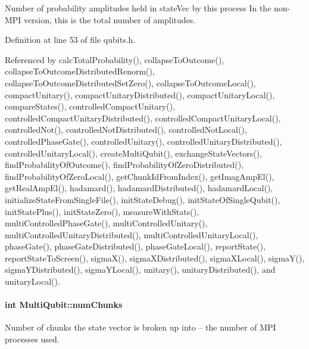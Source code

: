 Number of probability amplitudes held in state\+Vec by this process In the non-\/\+M\+PI version, this is the total number of amplitudes. 



Definition at line 53 of file qubits.\+h.



Referenced by calc\+Total\+Probability(), collapse\+To\+Outcome(), collapse\+To\+Outcome\+Distributed\+Renorm(), collapse\+To\+Outcome\+Distributed\+Set\+Zero(), collapse\+To\+Outcome\+Local(), compact\+Unitary(), compact\+Unitary\+Distributed(), compact\+Unitary\+Local(), compare\+States(), controlled\+Compact\+Unitary(), controlled\+Compact\+Unitary\+Distributed(), controlled\+Compact\+Unitary\+Local(), controlled\+Not(), controlled\+Not\+Distributed(), controlled\+Not\+Local(), controlled\+Phase\+Gate(), controlled\+Unitary(), controlled\+Unitary\+Distributed(), controlled\+Unitary\+Local(), create\+Multi\+Qubit(), exchange\+State\+Vectors(), find\+Probability\+Of\+Outcome(), find\+Probability\+Of\+Zero\+Distributed(), find\+Probability\+Of\+Zero\+Local(), get\+Chunk\+Id\+From\+Index(), get\+Imag\+Amp\+El(), get\+Real\+Amp\+El(), hadamard(), hadamard\+Distributed(), hadamard\+Local(), initialize\+State\+From\+Single\+File(), init\+State\+Debug(), init\+State\+Of\+Single\+Qubit(), init\+State\+Plus(), init\+State\+Zero(), measure\+With\+Stats(), multi\+Controlled\+Phase\+Gate(), multi\+Controlled\+Unitary(), multi\+Controlled\+Unitary\+Distributed(), multi\+Controlled\+Unitary\+Local(), phase\+Gate(), phase\+Gate\+Distributed(), phase\+Gate\+Local(), report\+State(), report\+State\+To\+Screen(), sigma\+X(), sigma\+X\+Distributed(), sigma\+X\+Local(), sigma\+Y(), sigma\+Y\+Distributed(), sigma\+Y\+Local(), unitary(), unitary\+Distributed(), and unitary\+Local().

\paragraph[{\texorpdfstring{num\+Chunks}{numChunks}}]{\setlength{\rightskip}{0pt plus 5cm}int Multi\+Qubit\+::num\+Chunks}\hypertarget{structMultiQubit_acd43f2f57991709c9e94f73662c972b2}{}\label{structMultiQubit_acd43f2f57991709c9e94f73662c972b2}


Number of chunks the state vector is broken up into -- the number of M\+PI processes used. 



